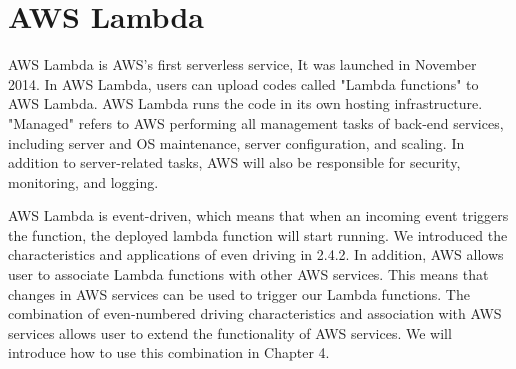 \section{AWS Lambda}
AWS Lambda is AWS's first serverless service,
It was launched in November 2014. In AWS Lambda, users can upload codes called "Lambda functions" to AWS Lambda. AWS Lambda runs the code in its own hosting infrastructure. "Managed" refers to AWS performing all management tasks of back-end services, including server and OS maintenance, server configuration, and scaling. In addition to server-related tasks, AWS will also be responsible for security, monitoring, and logging.
\par
AWS Lambda is event-driven, which means that when an incoming event triggers the function, the deployed lambda function will start running. We introduced the characteristics and applications of even driving in 2.4.2. In addition, AWS allows user to associate Lambda functions with other AWS services. This means that changes in AWS services can be used to trigger our Lambda functions. The combination of even-numbered driving characteristics and association with AWS services allows user to extend the functionality of AWS services. We will introduce how to use this combination in Chapter 4.
